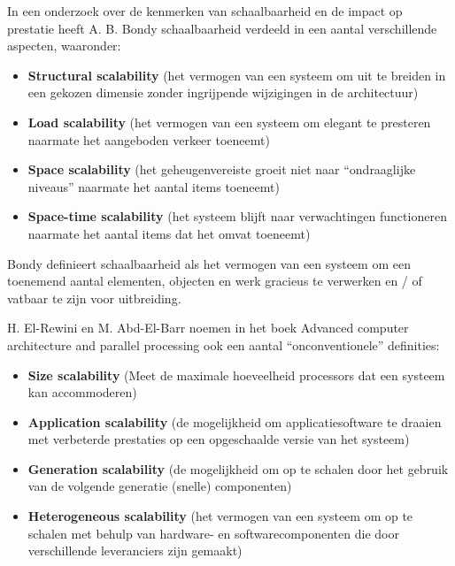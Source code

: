In een onderzoek over de kenmerken van schaalbaarheid en de impact op prestatie heeft A. B. Bondy \parencite{ScalabilityCharacteristics} schaalbaarheid verdeeld in een aantal verschillende aspecten, waaronder:
\begin{itemize}
	\item \textbf{Structural scalability} (het vermogen van een systeem om uit te breiden in een gekozen dimensie zonder ingrijpende wijzigingen in de architectuur)
	\item \textbf{Load scalability} (het vermogen van een systeem om elegant te presteren naarmate het aangeboden verkeer toeneemt)
	\item \textbf{Space scalability} (het geheugenvereiste groeit niet naar \enquote{ondraaglijke niveaus} naarmate het aantal items toeneemt)
	\item \textbf{Space-time scalability} (het systeem blijft naar verwachtingen functioneren naarmate het aantal items dat het omvat toeneemt)
\end{itemize}
Bondy definieert schaalbaarheid als het vermogen van een systeem om een toenemend aantal elementen, objecten en werk gracieus te verwerken en / of vatbaar te zijn voor uitbreiding.

H. El-Rewini en M. Abd-El-Barr noemen in het boek Advanced computer architecture and parallel processing \parencite{AdvancedArchitecture} ook een aantal \enquote{onconventionele} definities:
\begin{itemize}
	\item \textbf{Size scalability} (Meet de maximale hoeveelheid processors dat een systeem kan accommoderen)
	\item \textbf{Application scalability} (de mogelijkheid om applicatiesoftware te draaien met verbeterde prestaties op een opgeschaalde versie van het systeem)
	\item \textbf{Generation scalability} (de mogelijkheid om op te schalen door het gebruik van de volgende generatie (snelle) componenten)
	\item \textbf{Heterogeneous scalability} (het vermogen van een systeem om op te schalen met behulp van hardware- en softwarecomponenten die door verschillende leveranciers zijn gemaakt)
\end{itemize}

